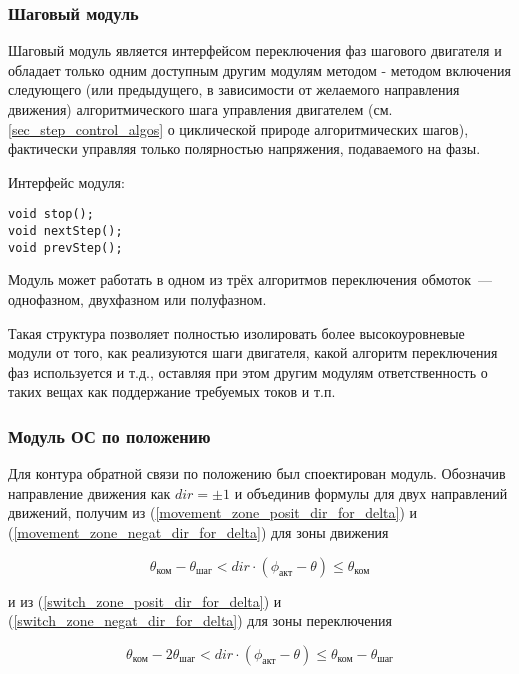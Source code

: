 \subsubsection{Шаговый модуль}

Шаговый модуль является интерфейсом переключения фаз шагового двигателя и
обладает только одним доступным другим модулям методом - методом включения
следующего (или предыдущего, в зависимости от желаемого направления движения)
алгоритмического шага управления двигателем (см. \ref{sec_step_control_algos}
о циклической природе алгоритмических шагов), фактически управляя только
полярностью напряжения, подаваемого на фазы.

Интерфейс модуля:
\begin{lstlisting}
void stop();
void nextStep();
void prevStep();
\end{lstlisting}

Модуль может работать в одном из трёх
алгоритмов переключения обмоток~--- однофазном, двухфазном или полуфазном.

Такая структура позволяет полностью изолировать более высокоуровневые модули от
того, как реализуются шаги двигателя, какой алгоритм переключения фаз
используется и т.д., оставляя при этом другим модулям ответственность о таких вещах
как поддержание требуемых токов и т.п.

\subsubsection{Модуль ОС по положению}
Для контура обратной связи по положению был споектирован модуль.
Обозначив направление движения как $\textit{dir} = \pm 1$ и объединив формулы
для двух направлений движений, получим из (\ref{movement_zone_posit_dir_for_delta})
и (\ref{movement_zone_negat_dir_for_delta}) для зоны движения

\begin{equation}
    \label{movement_zone_for_delta}
    \theta_\textit{ком} - \theta_\textit{шаг}
    < dir \cdot (\phi_\textit{акт} - \theta)
    \leq \theta_\textit{ком}
\end{equation}

и из (\ref{switch_zone_posit_dir_for_delta})
и (\ref{switch_zone_negat_dir_for_delta}) для зоны переключения

\begin{equation}
    \label{switch_zone_for_delta}
    \theta_\textit{ком} - 2\theta_\textit{шаг}
    < dir \cdot (\phi_\textit{акт} - \theta)
    \leq \theta_\textit{ком} - \theta_\textit{шаг}
\end{equation}

